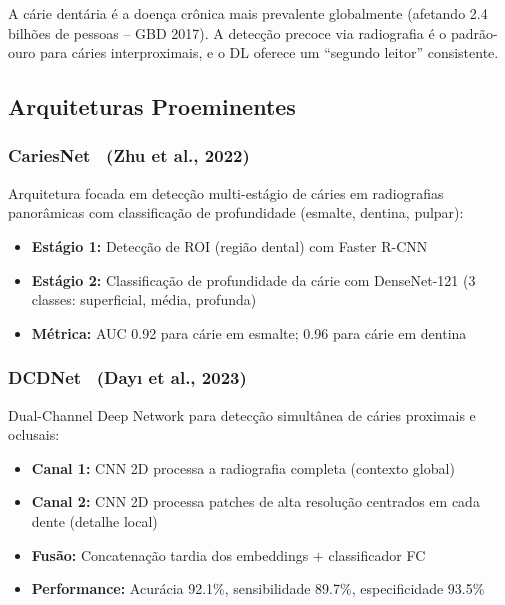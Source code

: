 A cárie dentária é a doença crônica mais prevalente globalmente (afetando 2.4
bilhões de pessoas -- GBD 2017). A detecção precoce via radiografia é o padrão-ouro
para cáries interproximais, e o DL oferece um ``segundo leitor'' consistente.

\subsection{Arquiteturas Proeminentes}

\subsubsection*{CariesNet~\cite{zhu2022cariesnet} (Zhu et al., 2022)}

Arquitetura focada em detecção multi-estágio de cáries em radiografias panorâmicas
com classificação de profundidade (esmalte, dentina, pulpar):

\begin{itemize}
  \item \textbf{Estágio 1:} Detecção de ROI (região dental) com Faster R-CNN
  \item \textbf{Estágio 2:} Classificação de profundidade da cárie com
        DenseNet-121 (3 classes: superficial, média, profunda)
  \item \textbf{Métrica:} AUC 0.92 para cárie em esmalte; 0.96 para cárie em dentina
\end{itemize}

\subsubsection*{DCDNet~\cite{dayi2023dcdnet} (Dayı et al., 2023)}

Dual-Channel Deep Network para detecção simultânea de cáries proximais e oclusais:

\begin{itemize}
  \item \textbf{Canal 1:} CNN 2D processa a radiografia completa (contexto global)
  \item \textbf{Canal 2:} CNN 2D processa patches de alta resolução centrados
        em cada dente (detalhe local)
  \item \textbf{Fusão:} Concatenação tardia dos embeddings + classificador FC
  \item \textbf{Performance:} Acurácia 92.1\%, sensibilidade 89.7\%, especificidade 93.5\%
\end{itemize}

